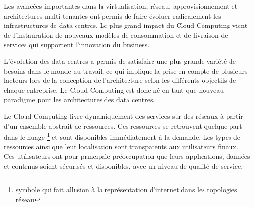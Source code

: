 \par
Les avancées importantes dans la virtualisation, réseau, approvisionnement et architectures multi-tenantes ont permis de faire évoluer radicalement les infrastructures de data centres. Le plus grand impact du Cloud Computing vient de l'instauration de nouveaux modèles de consommation et de livraison de services qui supportent l'innovation du business.



L'évolution des data centres a permis de satisfaire une plus grande variété de besoins dans le monde du travail, ce qui implique la prise en compte de plusieurs facteurs lors de la conception de l'architecture selon les différents objectifs de chaque entreprise. Le Cloud Computing est donc né en tant que nouveau paradigme pour les architectures des data centres.


Le Cloud Computing livre dynamiquement des services sur des réseaux à partir d'un ensemble abstrait de ressources. Ces ressources se retrouvent quelque part dans le \og nuage \fg{} \footnote{symbole qui fait allusion à la représentation d'internet dans les topologies réseau} et sont disponibles immédiatement à la demande. Les types de ressources ainsi que leur localisation sont transparents aux utilisateurs finaux. Ces utilisateurs ont pour principale préoccupation que leurs applications, données et contenus soient sécurisés et disponibles, avec un niveau de qualité de service.



